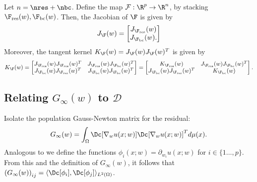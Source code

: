 \begin{lemma}
\label{lemma:jac_ntk}
    Let $n = \nres+\nbc$. Define the map $\mathcal F:\R^p\rightarrow \R^{n}$, by stacking $\F_{\textup{res}}(w), \F_{\textup{bc}}(w)$.
    Then, the Jacobian of $\F$ is given by
    \[
    J_\F(w) = \begin{bmatrix}
        J_{\F_{\textup{res}}}(w) \\
        J_{\F_{\textup{bc}}}(w).
    \end{bmatrix}
    \]
    Moreover, the tangent kernel $K_\F(w) = J_\F(w)J_\F(w)^{T}$ is given by
    \[ K_\F(w) = 
    \begin{bmatrix}
        J_{\F_{\textup{res}}}(w)J_{\F_{\textup{res}}}(w)^{T} & J_{\F_{\textup{res}}}(w)J_{\F_{\textup{bc}}}(w)^{T}  \\
        J_{\F_{\textup{bc}}}(w)J_{\F_{\textup{res}}}(w)^{T} & J_{\F_{\textup{bc}}}(w)J_{\F_{\textup{bc}}}(w)^{T} 
    \end{bmatrix} =
    \begin{bmatrix}
        K_{\F_{\textup{res}}}(w) & J_{\F_{\textup{res}}}(w)J_{\F_{\textup{bc}}}(w)^{T}  \\
        J_{\F_{\textup{bc}}}(w)J_{\F_{\textup{res}}}(w)^{T} & K_{\F_{\textup{bc}}}(w) 
    \end{bmatrix}.
    \]
\end{lemma}

\subsection{Relating $G_{\infty}(w)$ to $\mathcal D$}
Isolate the population Gauss-Newton matrix for the residual:
\[
G_{\infty}(w) = \int_{\Omega}\Dc[\nabla_w u(x;w)]\Dc[\nabla_w u(x;w)]^{T}d\mu(x).
\]
Analogous to \citet{de2023operator} we define the functions $\phi_i(x;w) = \partial_{w_i}u(x;w)$ for $i\in\{1\dots,p\}$.
From this and the definition of $G_{\infty}(w)$, it follows that $\left(G_\infty(w)\right)_{ij} = \langle \Dc[\phi_i], \Dc[\phi_j]\rangle_{L^2(\Omega)}$.

